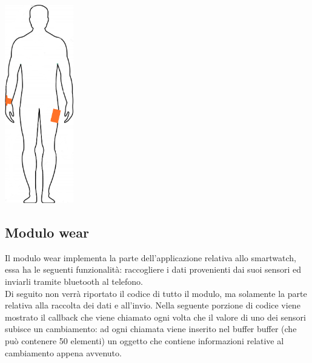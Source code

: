 \documentclass[a4paper, oneside]{book}
\begin{document}
\makebox[\linewidth]{}
\begin{minipage}{\linewidth}
\begin{center}
\includegraphics[width=30mm]{./images/sagoma_phone_watch.jpg} 
\makebox[\linewidth]{}
\end{center}
\end{minipage}
\makebox[\linewidth]{}
\makebox[\linewidth]{}


\subsection{Modulo wear}
Il modulo wear implementa la parte dell’applicazione relativa allo smartwatch, essa ha le seguenti funzionalità: raccogliere i dati provenienti dai suoi sensori ed inviarli tramite bluetooth al telefono.\\
Di seguito non verrà riportato il codice di tutto il modulo, ma solamente la parte relativa alla raccolta dei dati e all’invio.
Nella seguente porzione di codice viene mostrato il callback che viene chiamato ogni volta che il valore di uno dei sensori subisce un cambiamento: ad ogni chiamata viene inserito nel buffer buffer (che può contenere 50 elementi) un oggetto che contiene informazioni relative al cambiamento appena avvenuto.
\makebox[\linewidth]{}
\makebox[\linewidth]{}



\end{document}
